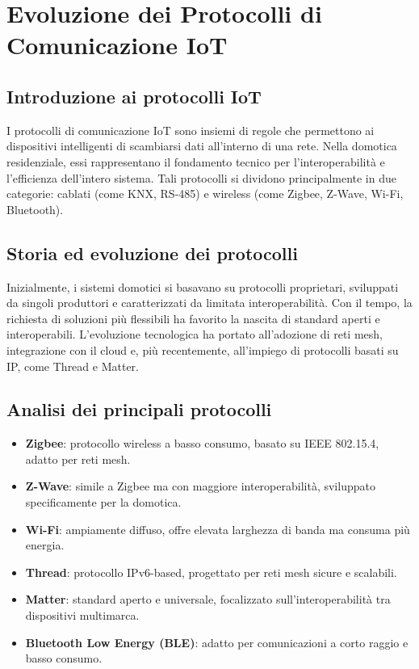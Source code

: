 \chapter{Evoluzione dei Protocolli di Comunicazione IoT}
\section{Introduzione ai protocolli IoT}
I protocolli di comunicazione IoT sono insiemi di regole che permettono ai dispositivi intelligenti di scambiarsi dati all’interno di una rete. Nella domotica residenziale, essi rappresentano il fondamento tecnico per l’interoperabilità e l’efficienza dell’intero sistema. Tali protocolli si dividono principalmente in due categorie: cablati (come KNX, RS-485) e wireless (come Zigbee, Z-Wave, Wi-Fi, Bluetooth).

\section{Storia ed evoluzione dei protocolli}
Inizialmente, i sistemi domotici si basavano su protocolli proprietari, sviluppati da singoli produttori e caratterizzati da limitata interoperabilità. Con il tempo, la richiesta di soluzioni più flessibili ha favorito la nascita di standard aperti e interoperabili. L’evoluzione tecnologica ha portato all’adozione di reti mesh, integrazione con il cloud e, più recentemente, all’impiego di protocolli basati su IP, come Thread e Matter.

\section{Analisi dei principali protocolli}
\begin{itemize}
    \item \textbf{Zigbee}: protocollo wireless a basso consumo, basato su IEEE 802.15.4, adatto per reti mesh.
    \item \textbf{Z-Wave}: simile a Zigbee ma con maggiore interoperabilità, sviluppato specificamente per la domotica.
    \item \textbf{Wi-Fi}: ampiamente diffuso, offre elevata larghezza di banda ma consuma più energia.
    \item \textbf{Thread}: protocollo IPv6-based, progettato per reti mesh sicure e scalabili.
    \item \textbf{Matter}: standard aperto e universale, focalizzato sull’interoperabilità tra dispositivi multimarca.
    \item \textbf{Bluetooth Low Energy (BLE)}: adatto per comunicazioni a corto raggio e basso consumo.
\end{itemize}

